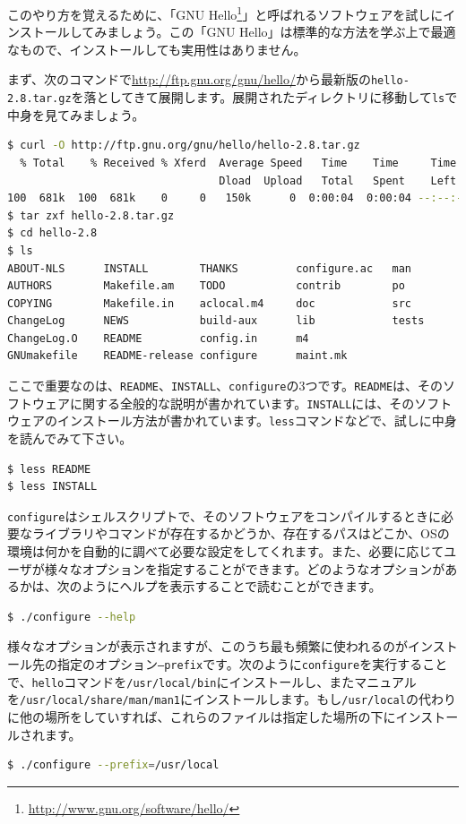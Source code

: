 このやり方を覚えるために、「GNU Hello\footnote{\url{http://www.gnu.org/software/hello/}}」と呼ばれるソフトウェアを試しにインストールしてみましょう。この「GNU Hello」は標準的な方法を学ぶ上で最適なもので、インストールしても実用性はありません。

まず、次のコマンドで\url{http://ftp.gnu.org/gnu/hello/}から最新版の\texttt{hello-2.8.tar.gz}を落としてきて展開します。展開されたディレクトリに移動して\texttt{ls}で中身を見てみましょう。

\begin{lstlisting}[language=bash]
$ curl -O http://ftp.gnu.org/gnu/hello/hello-2.8.tar.gz
  % Total    % Received % Xferd  Average Speed   Time    Time     Time  Current
                                 Dload  Upload   Total   Spent    Left  Speed
100  681k  100  681k    0     0   150k      0  0:00:04  0:00:04 --:--:--  166k
$ tar zxf hello-2.8.tar.gz
$ cd hello-2.8 
$ ls
ABOUT-NLS      INSTALL        THANKS         configure.ac   man
AUTHORS        Makefile.am    TODO           contrib        po
COPYING        Makefile.in    aclocal.m4     doc            src
ChangeLog      NEWS           build-aux      lib            tests
ChangeLog.O    README         config.in      m4
GNUmakefile    README-release configure      maint.mk
\end{lstlisting}

ここで重要なのは、\texttt{README}、\texttt{INSTALL}、\texttt{configure}の3つです。\texttt{README}は、そのソフトウェアに関する全般的な説明が書かれています。\texttt{INSTALL}には、そのソフトウェアのインストール方法が書かれています。\texttt{less}コマンドなどで、試しに中身を読んでみて下さい。

\begin{lstlisting}[language=bash]
$ less README
$ less INSTALL
\end{lstlisting}

\texttt{configure}はシェルスクリプトで、そのソフトウェアをコンパイルするときに必要なライブラリやコマンドが存在するかどうか、存在するパスはどこか、OSの環境は何かを自動的に調べて必要な設定をしてくれます。また、必要に応じてユーザが様々なオプションを指定することができます。どのようなオプションがあるかは、次のようにヘルプを表示することで読むことができます。

\begin{lstlisting}[language=bash]
$ ./configure --help
\end{lstlisting}

様々なオプションが表示されますが、このうち最も頻繁に使われるのがインストール先の指定のオプション\texttt{--prefix}です。次のように\texttt{configure}を実行することで、\texttt{hello}コマンドを\texttt{/usr/local/bin}にインストールし、またマニュアルを\texttt{/usr/local/share/man/man1}にインストールします。もし\texttt{/usr/local}の代わりに他の場所をしていすれば、これらのファイルは指定した場所の下にインストールされます。
\begin{lstlisting}[language=bash]
$ ./configure --prefix=/usr/local
\end{lstlisting} 

